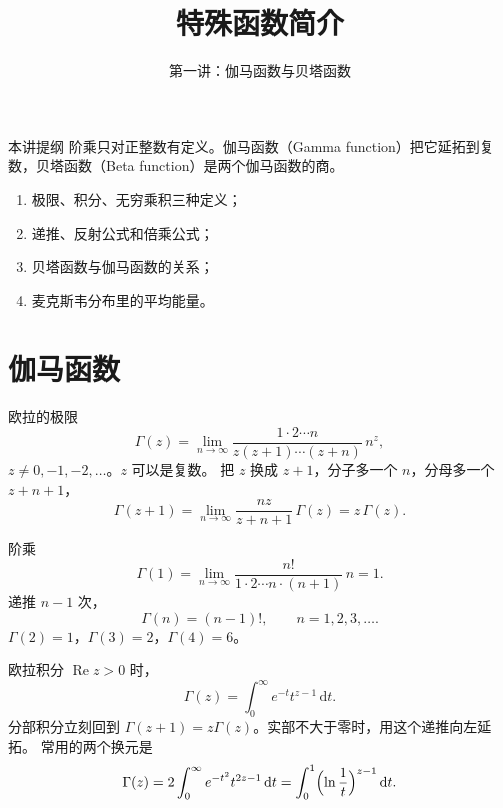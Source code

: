 \documentclass[fontset=windows, chinese, 10pt, xcolor=dvipsnames]{beamer}
\title{特殊函数简介}
\subtitle{第一讲：伽马函数与贝塔函数}
\begin{document}
\begin{frame}
  \titlepage
\end{frame}

\begin{frame}{本讲提纲}
  阶乘只对正整数有定义。伽马函数（Gamma function）把它延拓到复数，贝塔函数（Beta function）是两个伽马函数的商。
  \begin{enumerate}
    \item 极限、积分、无穷乘积三种定义；
    \item 递推、反射公式和倍乘公式；
    \item 贝塔函数与伽马函数的关系；
    \item 麦克斯韦分布里的平均能量。
  \end{enumerate}
\end{frame}

\section{伽马函数}

\begin{frame}{欧拉的极限}
  \begin{equation*}
    \Gamma(z)
    =\lim_{n\to\infty}
      \frac{1\cdot 2\cdots n}{z(z+1)\cdots(z+n)}\,n^{z},
  \end{equation*}
  $z\neq 0,-1,-2,\ldots$。$z$ 可以是复数。
  \vspace{0.4em}
  把 $z$ 换成 $z+1$，分子多一个 $n$，分母多一个 $z+n+1$，
  \[
    \Gamma(z+1)
    =\lim_{n\to\infty}\frac{nz}{z+n+1}\,\Gamma(z)
    =z\,\Gamma(z).
  \]
\end{frame}

\begin{frame}{阶乘}
  \[
    \Gamma(1)
    =\lim_{n\to\infty}\frac{n!}{1\cdot 2\cdots n\cdot(n+1)}\,n
    =1.
  \]
  递推 $n-1$ 次，
  \begin{equation*}
    \boxed{\displaystyle
      \Gamma(n)=(n-1)!,
      \qquad n=1,2,3,\ldots.}
  \end{equation*}
  $\Gamma(2)=1$，$\Gamma(3)=2$，$\Gamma(4)=6$。
\end{frame}

\begin{frame}{欧拉积分}
  $\operatorname{Re} z>0$ 时，
  \begin{equation*}
    \boxed{\displaystyle
      \Gamma(z)=\int_0^{\infty} e^{-t} t^{z-1}\,\mathrm{d}t.}
  \end{equation*}
  分部积分立刻回到 $\Gamma(z+1)=z\Gamma(z)$。实部不大于零时，用这个递推向左延拓。
  \vspace{0.35em}
  常用的两个换元是
  \[
    \Gamma(z)=2\int_0^{\infty} e^{-t^2} t^{2z-1}\,\mathrm{d}t
    =\int_0^{1}\Bigl(\ln\frac{1}{t}\Bigr)^{z-1}\,\mathrm{d}t.
  \]
\end{frame}
\end{document}
